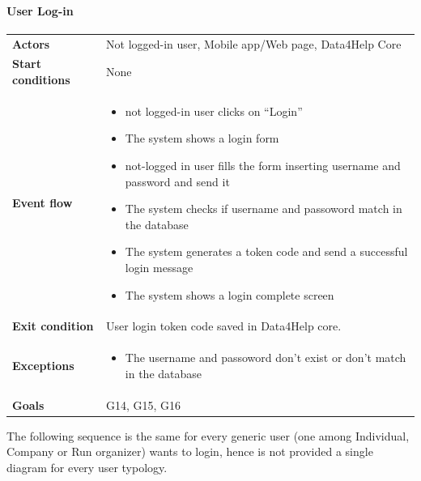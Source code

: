 \paragraph{User Log-in}
\begin{center}
\begin{table}[H]
\centering
\begin{tabular}{l|p{}}
\textbf{Actors} & Not logged-in user, Mobile app/Web page, Data4Help Core \\
\textbf{Start conditions} & None \\
\textbf{Event flow}  & 


 \begin{minipage}[t] {0.7\textwidth} 
 \begin{itemize}
      \item  not logged-in user clicks on “Login”
      \item The system shows a login form
      \item not-logged in user fills the form inserting username and password and send it
      \item The system checks if username and passoword match in the database
      \item The system generates a token code and send a successful login message
      \item The system shows a login complete screen
  \end{itemize}
\end{minipage}
 \\
\textbf{Exit condition} & User login token code saved in Data4Help core. \\
\textbf{Exceptions} & 
\begin{minipage}[t] {0.7\textwidth} 
 \begin{itemize}
 
 \item The username and passoword don't exist or don't match in the database
\end{itemize}
 \end{minipage}\\
\textbf{Goals} & G14, G15, G16 
\end{tabular}




\end{table}
\end{center}

\noindent
The following sequence is the same for every generic user (one among Individual, Company or Run organizer) wants to login, hence is not provided a single diagram for every user typology. 


